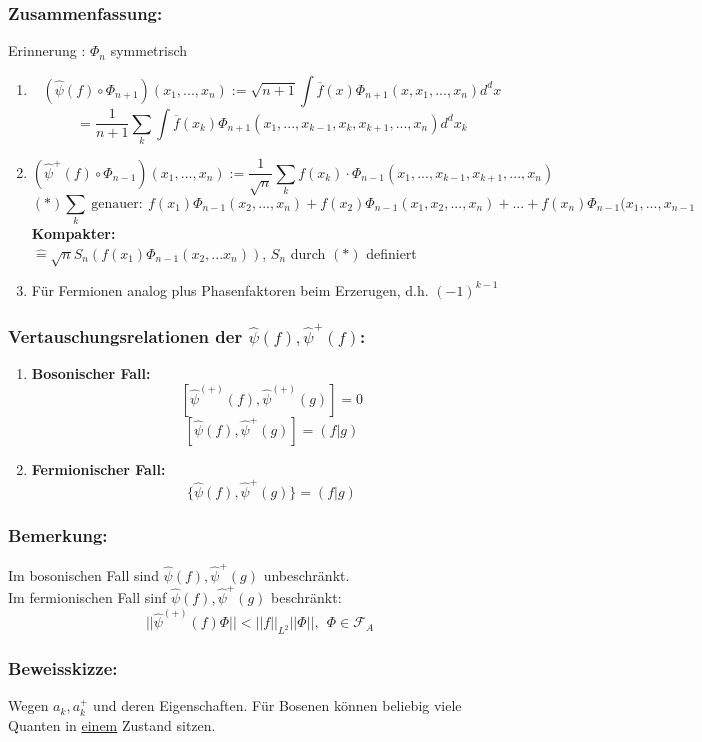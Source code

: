 \documentclass[twoside,a4paper]{scrartcl}
\renewcommand{\1}{\mathds{1}}
\newcommand{\F}{\mathcal{F}}
\begin{document}
\subsubsection*{Zusammenfassung:}
Erinnerung : $\Phi_n$ symmetrisch
\begin{enumerate}
\item $$(\hat \psi(f)\circ \Phi_{n+1})(x_1,...,x_n):=\sqrt{n+1} \int \overline{f}(x) \Phi_{n+1}(x,x_1,...,x_n)d^dx$$
$$=\frac{1}{n+1} \sum_k \int \overline{f}(x_k) \Phi_{n+1}(x_1,...,x_{k-1},x_k,x_{k+1},...,x_n)d^dx_k$$
\item $$(\hat \psi^+(f)\circ \Phi_{n-1})(x_1,...,x_n):=\frac{1}{\sqrt{n}} \sum_k f(x_k)\cdot \Phi_{n-1}(x_1,...,x_{k-1},x_{k+1},...,x_n)$$
$$(*) \sum_k \ \mathrm{genauer:} \ f(x_1)\Phi_{n-1}(x_2,...,x_n)+f(x_2)\Phi_{n-1}(x_1,x_2,...,x_n)+...+ f(x_n)\Phi_{n-1}(x_1,...,x_{n-1}$$
\textbf{Kompakter:}\\
$\mathrel{\widehat{=}} \sqrt{n} S_n(f(x_1) \Phi_{n-1}(x_2,...x_n))$, $S_n$ durch $(*)$ definiert
\item Für Fermionen analog plus Phasenfaktoren beim Erzerugen, d.h. $(-1)^{k-1}$
\end{enumerate}
\subsubsection*{Vertauschungsrelationen der $\hat \psi(f), \hat \psi^+(f)$:}
\begin{enumerate}
\item \textbf{Bosonischer Fall:}
$$[\hat \psi^{(+)}(f),\hat \psi^{(+)}(g)]=0$$
$$[\hat \psi(f),\hat \psi^{+}(g)]=(f|g)$$
\item \textbf{Fermionischer Fall:}
$$\{\hat \psi(f),\hat \psi^{+}(g)\}=(f|g)$$
\end{enumerate}
\subsubsection*{Bemerkung:}
Im bosonischen Fall sind $\hat \psi(f), \hat \psi^+(g)$ unbeschränkt.\\
Im fermionischen Fall sinf $\hat \psi(f), \hat \psi^+(g)$ beschränkt:
$$||\hat \psi^{(+)}(f)\Phi||<||f||_{L^2}||\Phi||, \ \ \Phi \in \F_A$$
\subsubsection*{Beweisskizze:}
Wegen $a_k, a_k^+$ und deren Eigenschaften. Für Bosenen können beliebig viele Quanten in \underline{einem} Zustand sitzen.
\end{document}
